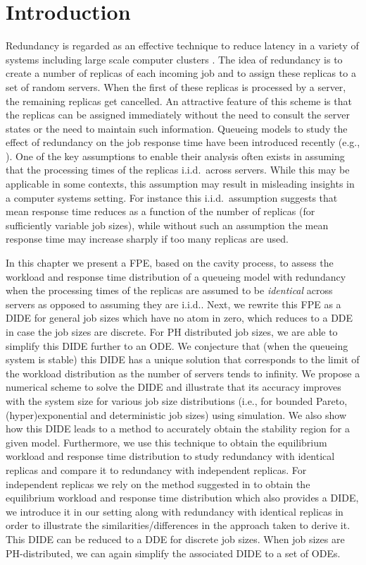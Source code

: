 \documentclass[12pt]{report}
\begin{document}
\section{Introduction}
Redundancy is regarded as an effective technique to reduce latency in a variety of systems including
large scale computer clusters \cite{shah2016when,clones13,delta18,youri18}. 
The idea of redundancy is to create a number of replicas of each incoming job and to assign these replicas to a set
of random servers. When the first of these replicas is processed by a server, the remaining replicas get cancelled.
An attractive feature of this scheme is that the replicas can be assigned immediately without the need to consult the
server states or the need to maintain such information. 
Queueing models to study the effect of redundancy on the job response time have been introduced recently
(e.g., \cite{gardnerOR,Ayesta18}). One of the key assumptions to enable their analysis often exists in assuming that the 
processing times of the replicas i.i.d.~across servers.
While this may be applicable in some contexts, this assumption may result in misleading insights in a computer systems 
setting. For instance this i.i.d.~assumption suggests that mean response time reduces as a function of the number
of replicas (for sufficiently variable job sizes), while without such an assumption the mean response time may increase sharply if too many
replicas are used.
 
In this chapter we present a FPE, based on the cavity process, to assess the workload and response time distribution of a queueing model with redundancy when the processing times of the replicas are assumed to be {\it identical} across servers as opposed to assuming they are i.i.d.. Next, we rewrite this FPE as a DIDE for general job sizes which have no atom in zero, which reduces to a DDE in case the job sizes are discrete. For PH distributed job sizes, we are able to simplify this DIDE further to an ODE.
We conjecture that (when the queueing system is stable) this DIDE has a unique solution that corresponds to the limit of the workload distribution as the number of servers tends to infinity. We propose a numerical scheme to solve the DIDE and illustrate that its accuracy improves with the system size for various job size distributions (i.e., for bounded Pareto, (hyper)exponential and deterministic job sizes) using simulation. We also show how this DIDE leads to a method to accurately obtain the stability region for a given model. Furthermore, we use this technique to obtain the equilibrium workload and response time distribution to study redundancy with identical replicas and compare it to redundancy with independent replicas. For independent replicas we rely on the method suggested in \cite{gardnerOR} to obtain the equilibrium workload and response time distribution which also provides a DIDE, we introduce it in our setting along with redundancy with identical replicas in order to illustrate the similarities/differences in the approach taken to derive it. This DIDE can be reduced to a DDE for discrete job sizes. When job sizes are PH-distributed, we can again simplify the associated DIDE to a set of ODEs.
\end{document}
